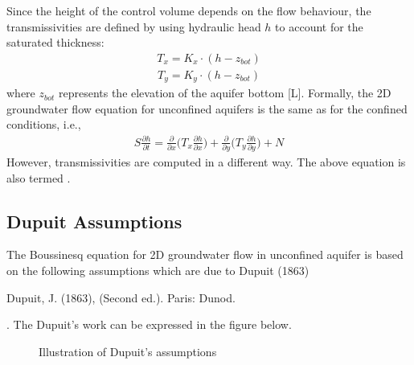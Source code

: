 \documentclass[letterpaper,10pt,english]{jupyterBook}
\begin{document}
\sphinxAtStartPar
Since the height of the control volume depends on the flow behaviour, the transmissivities are defined by using hydraulic head \(h\) to account for the saturated thickness:
\begin{equation*}
\begin{split}
T_x = K_x \cdot (h-z_{bot})
\end{split}
\end{equation*}\begin{equation*}
\begin{split}
T_y = K_y \cdot (h-z_{bot})
\end{split}
\end{equation*}
\sphinxAtStartPar
where \(z_{bot}\) represents the elevation of the aquifer bottom {[}L{]}. Formally, the 2D groundwater flow equation for unconfined aquifers is the same as for the confined conditions, i.e.,
\begin{equation*}
\begin{split}
S\frac{\partial h}{\partial t} = \frac{\partial }{\partial x}\bigg(T_x\frac{\partial h}{\partial x}\bigg) + \frac{\partial }{\partial y}\bigg(T_y\frac{\partial h}{\partial y}\bigg) + N
\end{split}
\end{equation*}
\sphinxAtStartPar
However, transmissivities are computed in a different way. The above equation is also termed .


\subsection{Dupuit Assumptions}
\label{\detokenize{content/flow/L7/17_quantify_flow:dupuit-assumptions}}
\sphinxAtStartPar
The Boussinesq equation for 2D groundwater flow in unconfined aquifer is based on the following assumptions which are due to Dupuit (1863)%
\begin{footnote}[1]\sphinxAtStartFootnote
Dupuit, J. (1863),  (Second ed.). Paris: Dunod.
%
\end{footnote}. The Dupuit’s work can be expressed in the figure below.

\begin{figure}[htbp]
\centering
\capstart

\noindent{}
\caption{Illustration of Dupuit’s assumptions}\label{\detokenize{content/flow/L7/17_quantify_flow:id4}}\end{figure}
\end{document}
